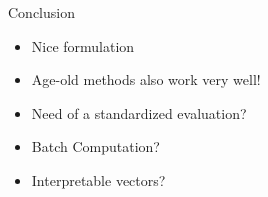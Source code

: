 \begin{frame}{Conclusion}
  \begin{itemize}[<+->]
  \item Nice formulation
  \item Age-old methods also work very well!
  \item Need of a standardized evaluation?
  \item Batch Computation?
  \item Interpretable vectors?
  \end{itemize}
\end{frame}

